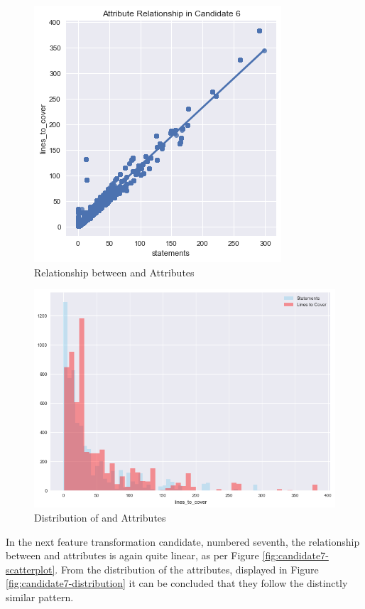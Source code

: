 \begin{enumerate}
\begin{figure}[!h]
    \centering
    \includegraphics[scale=0.7]{Figures/correlation/Attribute_Relationship_in_Candidate_6.png}
    \caption{Relationship between \statements{} and \linesToCover{} Attributes}
    \label{fig:candidate6-scatterplot}
\end{figure}

\begin{figure}
    \centering
    \includegraphics[scale=0.6]{Figures/correlation/Attribute_Distribution_in_Candidate_6.png}
    \caption{Distribution of \statements{} and \linesToCover{} Attributes}
    \label{fig:candidate6-distribution}
\end{figure}

In the next feature transformation candidate, numbered seventh, the relationship between \ncloc{} and \lines{} attributes is again quite linear, as per Figure \ref{fig:candidate7-scatterplot}. From the distribution of the attributes, displayed in Figure \ref{fig:candidate7-distribution} it can be concluded that they follow the distinctly similar pattern.


\end{enumerate}
